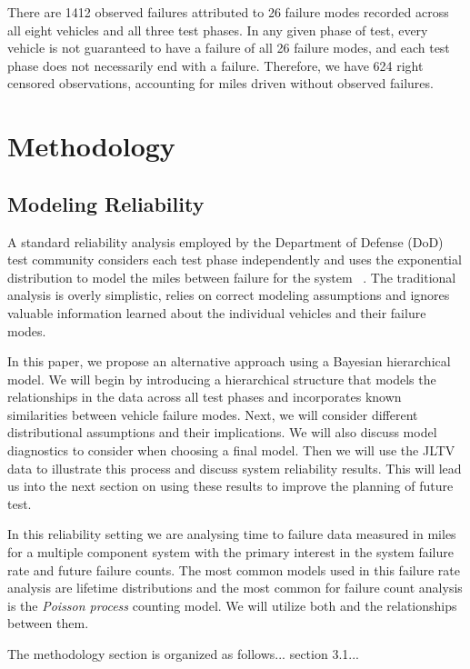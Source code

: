 \documentclass[12pt]{article}
\begin{document}
There are 1412 observed failures attributed to 26 failure modes recorded across
all eight vehicles and all three test phases. In any given phase of test, every
vehicle is not guaranteed to have a failure of all 26 failure modes, and each
test phase does not necessarily end with a failure. Therefore, we have 624 right
censored observations, accounting for miles driven without observed failures.

\section{Methodology}

\subsection{Modeling Reliability}
A standard reliability analysis employed by the Department of Defense (DoD) test
community considers each test phase independently and uses the exponential
distribution to model the miles between failure for the system ~\cite{ref1}. The
traditional analysis is overly simplistic, relies on correct modeling
assumptions and ignores valuable information learned about the individual
vehicles and their failure modes.

In this paper, we propose an alternative approach using a Bayesian hierarchical
model.  We will begin by introducing a hierarchical structure that models the
relationships in the data across all test phases and incorporates known
similarities between vehicle failure modes.  Next, we will consider different
distributional assumptions and their implications.  We will also
discuss model diagnostics to consider when choosing a final model. Then we will
use the JLTV data to illustrate this process and discuss system reliability
results. This will lead us into the next section on using these results to
improve the planning of future test.

In this reliability setting we are analysing time to failure data measured in
miles for a multiple component system with the primary interest in the system
failure rate and future failure counts.  The most common models used in this
failure rate analysis are lifetime distributions and the most common for failure
count analysis is the \emph{Poisson process} counting model.  We will utilize
both and the relationships between them.

The methodology section is organized as follows... section 3.1...
\end{document}

